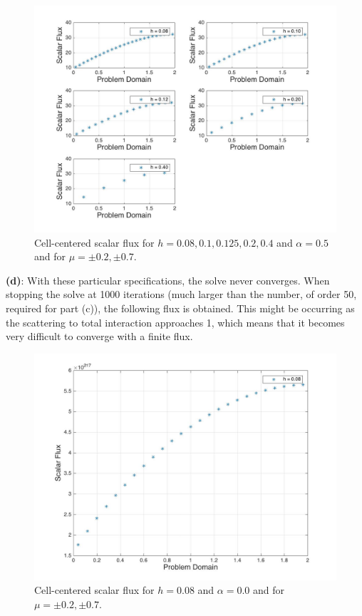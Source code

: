 \documentclass[10pt]{article}
\begin{document}
\begin{figure}[H]
  \centering
  \includegraphics[width=16cm]{ScalarFlux_partC.jpg} %
  \caption{Cell-centered scalar flux for \(h=0.08, 0.1, 0.125, 0.2, 0.4\) and \(\alpha=0.5\) and for \(\mu=\pm0.2, \pm0.7\).}
  \label{fig:end}
\end{figure}

\textbf{(d)}: With these particular specifications, the solve never converges. When stopping the solve at 1000 iterations (much larger than the number, of order 50, required for part (c)), the following flux is obtained. This might be occurring as the scattering to total interaction approaches 1, which means that it becomes very difficult to converge with a finite flux. 

\begin{figure}[H]
  \centering
  \includegraphics[width=12cm]{ScalarFlux_partD.jpg} %
  \caption{Cell-centered scalar flux for \(h=0.08\) and \(\alpha=0.0\) and for \(\mu=\pm0.2, \pm0.7\).}
  \label{fig:end2}
\end{figure}
\end{document}
